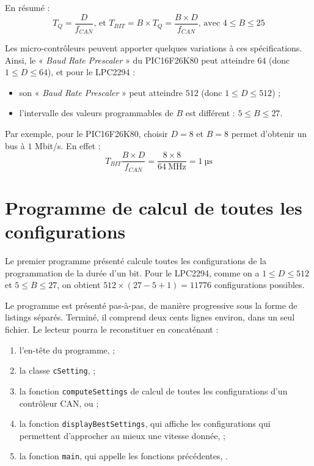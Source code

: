 En résumé :
\begin{equation*}
  T_Q = \frac{D}{f_{CAN}} \text{, et~}T_{BIT} = B \times T_Q = \frac{B\times D}{f_{CAN}}\text{, avec~} 4 \leqslant B \leqslant 25
\end{equation*}


Les micro-contrôleurs peuvent apporter quelques variations à ces spécifications. Ainsi, le « \emph{Baud Rate Prescaler} » du PIC16F26K80 peut atteindre $64$ (donc $1 \leqslant D \leqslant 64$), et pour le LPC2294 :
\begin{itemize}
  \item son « \emph{Baud Rate Prescaler} » peut atteindre $512$ (donc $1 \leqslant D \leqslant 512$) ;
  \item l'intervalle des valeurs programmables de $B$ est différent : $5 \leqslant B \leqslant 27$.
\end{itemize}

Par exemple, pour le PIC16F26K80, choisir $D=8$ et $B=8$ permet d'obtenir un bus à $1$ Mbit/s. En effet :
\begin{equation*}
  T_{BIT} \frac{B\times D}{f_{CAN}} = \frac{8\times 8}{64~\text{MHz}} = 1~\text{µs}
\end{equation*}

\section{Programme de calcul de toutes les configurations}

Le premier programme présenté calcule toutes les configurations de la programmation de la durée d'un bit. Pour le LPC2294, comme on a $1 \leqslant D \leqslant 512$ et $5 \leqslant B \leqslant 27$, on obtient $512 \times (27 - 5 + 1) = 11776$ configurations possibles.

Le programme est présenté pas-à-pas, de manière progressive sous la forme de listings séparés. Terminé, il comprend deux cents lignes environ, dans un seul fichier. Le lecteur pourra le reconstituer en concaténant :
\begin{enumerate}
  \item l'en-tête du programme,  ;
  \item la classe \texttt{cSetting},  ;
  \item la fonction \texttt{computeSettings} de calcul de toutes les configurations d'un contrôleur CAN,  ou  ;
  \item la fonction \texttt{displayBestSettings}, qui affiche les configurations qui permettent d'approcher au mieux une vitesse donnée,  ;
  \item la fonction \texttt{main}, qui appelle les fonctions précédentes, .
\end{enumerate}








